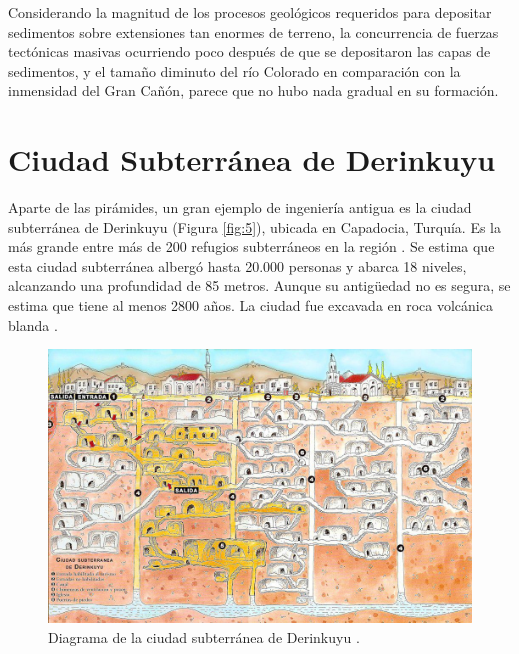 \documentclass[10pt,twocolumn,letterpaper]{article}
\begin{document}
Considerando la magnitud de los procesos geológicos requeridos para depositar sedimentos sobre extensiones tan enormes de terreno, la concurrencia de fuerzas tectónicas masivas ocurriendo poco después de que se depositaron las capas de sedimentos, y el tamaño diminuto del río Colorado en comparación con la inmensidad del Gran Cañón, parece que no hubo nada gradual en su formación.

\section{Ciudad Subterránea de Derinkuyu}

Aparte de las pirámides, un gran ejemplo de ingeniería antigua es la ciudad subterránea de Derinkuyu (Figura \ref{fig:5}), ubicada en Capadocia, Turquía. Es la más grande entre más de 200 refugios subterráneos en la región \cite{54}. Se estima que esta ciudad subterránea albergó hasta 20.000 personas y abarca 18 niveles, alcanzando una profundidad de 85 metros. Aunque su antigüedad no es segura, se estima que tiene al menos 2800 años. La ciudad fue excavada en roca volcánica blanda \cite{52, 53}.

\begin{figure}[b]
\begin{center}
   \includegraphics[width=1\linewidth]{derinkuyu.jpeg}
\end{center}
   \caption{Diagrama de la ciudad subterránea de Derinkuyu \cite{56}.}
\label{fig:5}
\label{fig:onecol}
\end{figure}
\end{document}
